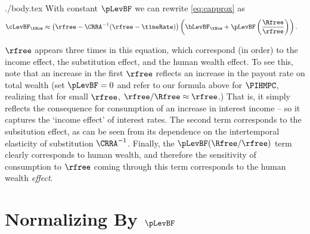 \documentclass{handout}
\begin{document}
\begin{verbatimwrite}{./body.tex}
With constant $\pLevBF$ we can rewrite \eqref{eq:capprox} as
\begin{equation}\begin{gathered}\begin{aligned}
        \cLevBF_{\tNow} & \approx  \left(\rfree-\CRRA^{-1}(\rfree-\timeRate)\right)\left(\bLevBF_{\tNow}+ \pLevBF\left(\frac{\Rfree}{\rfree}\right)\right).
\end{aligned}\end{gathered}\end{equation}

$\rfree$ appears three times in this equation, which correspond (in
order) to the income effect, the substitution effect, and the human
wealth effect.  To see this, note that an increase in the first
$\rfree$ reflects an increase in the payout rate on total wealth (set
$\pLevBF = 0$ and refer to our formula above for $\PIHMPC$, realizing
that for small $\rfree$, $\rfree/\Rfree \approx \rfree$.)  That is, it
simply reflects the consequence for consumption of an increase in interest
income -- so it captures the `income effect' of interest rates.  The second term
corresponds to the subsitution effect, as can be seen from its
dependence on the intertemporal elasticity of substitution
$\CRRA^{-1}$.  Finally, the $\pLevBF(\Rfree/\rfree)$ term clearly
corresponds to human wealth, and therefore the sensitivity of
consumption to $\rfree$ coming through this term corresponds to the
human wealth {\it effect}.  



\section{Normalizing By $\pLevBF$}


\end{verbatimwrite}
\end{document}
